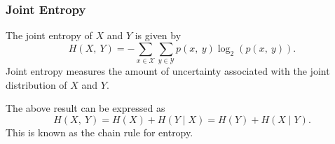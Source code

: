 \documentclass{article}
\begin{document}
\subsubsection{Joint Entropy}
The joint entropy of \(X\) and \(Y\) is given by
\begin{equation*}
    H\left( X,\: Y \right) = -\sum_{x \in \mathcal{X}} \sum_{y \in \mathcal{Y}} p\left( x,\: y \right) \log_2{\left( p\left( x,\: y \right) \right)}.
\end{equation*}
Joint entropy measures the amount of uncertainty associated with the
joint distribution of \(X\) and \(Y\).
\begin{theorem}
    The above result can be expressed as
    \begin{equation*}
        H\left( X,\: Y \right) = H\left( X \right) + H\left( Y \mid X \right) = H\left( Y \right) + H\left( X \mid Y \right).
    \end{equation*}
    This is known as the chain rule for entropy.
\end{theorem}
\end{document}
